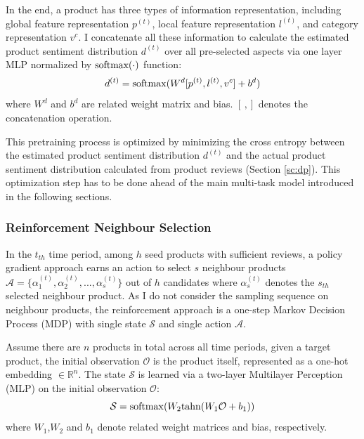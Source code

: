 In the end, a product has three types of information representation, including global feature representation $p^{(t)}$, local feature representation $l^{(t)}$, and category representation $v^{c}$. I concatenate all these information to calculate the estimated product sentiment distribution $d^{(t)}$ over all pre-selected aspects via one layer MLP normalized by $\rm softmax(\cdot)$ function:
\begin{equation}
d^{(t)} = {\rm softmax}(W^{d}[p^{(t)},l^{(t)},v^{c}]+b^{d})
\end{equation}
where $W^{d}$ and $b^{d}$ are related weight matrix and bias. $[\,, ]$ denotes the concatenation operation. 

This pretraining process is optimized by minimizing the cross entropy between the estimated product sentiment distribution $d^{(t)}$ and the actual product sentiment distribution calculated from product reviews (Section \ref{sc:dp}). This optimization step has to be done ahead of the main multi-task model introduced in the following sections.



\subsubsection{Reinforcement Neighbour Selection} \label{sc:rns}

In the $t_{th}$ time period, among $h$ seed products with sufficient reviews, a policy gradient approach earns an action to select $s$ neighbour products $\mathcal{A} = \{\alpha_{1}^{(t)},\alpha_{2}^{(t)},...,\alpha_{s}^{(t)}\}$ out of $h$ candidates where $\alpha_{s}^{(t)}$ denotes the $s_{th}$ selected neighbour product. As I do not consider the sampling sequence on neighbour products, the reinforcement approach is a one-step Markov Decision Process (MDP) with single state $\mathcal{S}$ and single action $\mathcal{A}$. 

Assume there are $n$ products in total across all time periods, given a target product, the initial observation $\mathcal{O}$ is the product itself, represented as a one-hot embedding $\in \mathbb{R}^{n}$. The state $\mathcal{S}$ is learned via a two-layer Multilayer Perception (MLP) on the initial observation $\mathcal{O}$:
\begin{equation}
\label{eq:state}
\mathcal{S} = {\rm softmax} (W_{2}{\rm tahn}(W_{1}\mathcal{O} + b_{1}))
\end{equation} 
where $W_1$,$W_2$ and $b_1$ denote related weight matrices and bias, respectively. 

